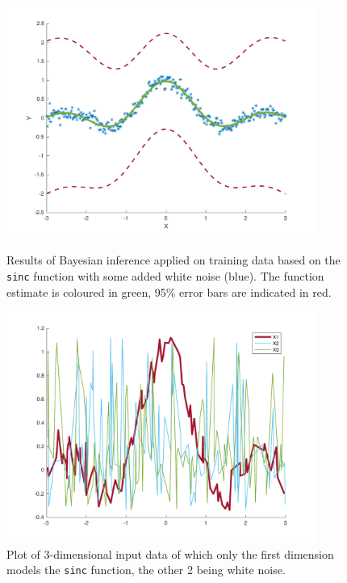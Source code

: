 \begin{figure}[h]
    \centering
    \begin{minipage}{0.45\textwidth}
        \centering
        \includegraphics[width=0.9\textwidth]{../src/figures/estimation/bayesian_inference}
        \caption{Results of Bayesian inference applied on training data based on the \texttt{sinc} function with some added white noise (blue). The function estimate is coloured in green, 95\% error bars are indicated in red.}
\label{bayesianinference}
    \end{minipage}\hfill
    \begin{minipage}{0.45\textwidth}
        \centering
        \includegraphics[width=0.9\textwidth]{../src/figures/estimation/ard}
        \caption{Plot of 3-dimensional input data of which only the first dimension models the \texttt{sinc} function, the other 2 being white noise.}
\label{ardsinc}
    \end{minipage}
\end{figure}

